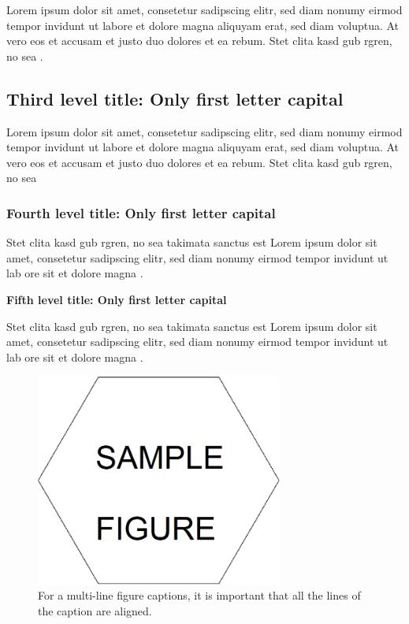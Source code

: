 Lorem ipsum dolor sit amet, consetetur sadipscing elitr, sed diam nonumy eirmod tempor invidunt ut labore et dolore magna aliquyam erat, sed diam voluptua. At vero eos et accusam et justo duo dolores et ea rebum. Stet clita kasd gub rgren, no sea \citep{Zuckerman199486}.

\subsection{Third level title: Only first letter capital}

\citet{Wolchik2000843} Lorem ipsum dolor sit amet, consetetur sadipscing elitr, sed diam nonumy eirmod tempor invidunt ut labore et dolore magna aliquyam erat, sed diam voluptua. At vero eos et accusam et justo duo dolores et ea rebum. Stet clita kasd gub rgren, no sea 

\subsubsection{Fourth level title: Only first letter capital}

\citet{Box:1990:TSA:574978} Stet clita kasd gub rgren, no sea takimata sanctus est Lorem ipsum dolor sit amet, consetetur sadipscing elitr, sed diam nonumy eirmod tempor invidunt ut lab ore sit et dolore magna \citep{HYP:HYP57}.

\textbf{Fifth level title: Only first letter capital}

Stet clita kasd gub rgren, no sea takimata sanctus est Lorem ipsum dolor sit amet, consetetur sadipscing elitr, sed diam nonumy eirmod tempor invidunt ut lab ore sit et dolore magna \citep{url-1,url-2}.

\vspace{6pt} %
\begin{figure}[!ht]
 \centering
 \includegraphics[width=230pt,keepaspectratio=true]{./fig/sekil6.png}
 \caption{For a multi-line figure captions, it is important that all the
  lines of the caption are aligned.}
 \label{fig:ch4-1}
\end{figure}
\vspace{-6pt} %

